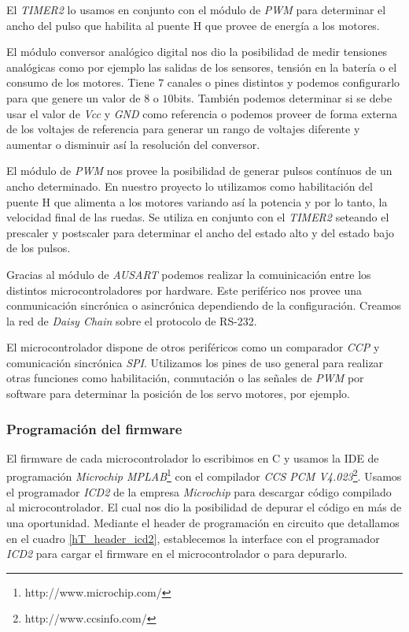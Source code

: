 El \emph{TIMER2} lo usamos en conjunto con el m\'odulo de \emph{PWM} para determinar el ancho del pulso que habilita al puente H
que provee de energ\'ia a los motores.

El m\'odulo conversor anal\'ogico digital nos dio la posibilidad de medir tensiones anal\'ogicas como por ejemplo
las salidas de los sensores, tensi\'on en la bater\'ia o el consumo de los motores.
Tiene $7$ canales o pines distintos y podemos configurarlo para que genere un valor de $8$ o $10$bits.
Tambi\'en podemos determinar si se debe usar el valor de \emph{Vcc} y \emph{GND} como referencia o podemos proveer
de forma externa de los voltajes de referencia para generar un rango de voltajes diferente y aumentar o disminuir
as\'i la resoluci\'on del conversor.

El m\'odulo de \emph{PWM} nos provee la posibilidad de generar pulsos cont\'inuos de un ancho determinado.
En nuestro proyecto lo utilizamos como habilitaci\'on del puente H que alimenta a los motores variando as\'i la
potencia y por lo tanto, la velocidad final de las ruedas.
Se utiliza en conjunto con el \emph{TIMER2} seteando el prescaler y postscaler para determinar el ancho del
estado alto y del estado bajo de los pulsos.

Gracias al m\'odulo de \emph{AUSART} podemos realizar la comuinicaci\'on entre los distintos microcontroladores por hardware.
Este perif\'erico nos provee una conmunicaci\'on sincr\'onica o asincr\'onica dependiendo de la configuraci\'on.
Creamos la red de \emph{Daisy Chain} sobre el protocolo de RS-232.

El microcontrolador dispone de otros perif\'ericos como un comparador \emph{CCP} y comunicaci\'on sincr\'onica \emph{SPI}.
Utilizamos los pines de uso general para realizar otras funciones como habilitaci\'on, conmutaci\'on o las se\~nales de
\emph{PWM} por software para determinar la posici\'on de los servo motores, por ejemplo.

\subsubsection{Programaci\'on del firmware}
\label{h_controlador_micro_programacion}

El firmware de cada microcontrolador lo escribimos en C y usamos la IDE de programaci\'on 
\emph{Microchip MPLAB}\footnote{http://www.microchip.com/} con el compilador \emph{CCS PCM V4.023}\footnote{http://www.ccsinfo.com/}.
Usamos el programador \emph{ICD2} de la empresa \emph{Microchip} para descargar c\'odigo compilado al microcontrolador.
El cual nos dio la posibilidad de depurar el c\'odigo en m\'as de una oportunidad.
Mediante el header de programaci\'on en circuito que detallamos en el cuadro \ref{hT_header_icd2}, establecemos la
interface con el programador \emph{ICD2} para cargar el firmware en el microcontrolador o para depurarlo.

